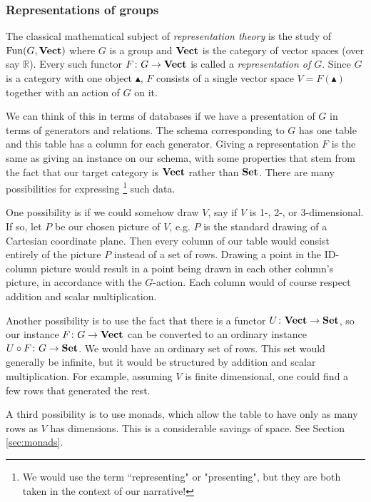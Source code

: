 \documentclass{book}
\def\tn{\textnormal}
\def\RR{{\mathbb R}}
\def\Fun{\tn{Fun}}
\def\to{\rightarrow}
\def\taking{\colon}
\def\monOb{\blacktriangle}
\def\Vect{{\bf Vect}}
\def\Set{{\bf Set}}
\theoremstyle{remark}
\theoremstyle{definition}
\begin{document}

\subsubsection{Representations of groups}\label{ex:reps of groups}

The classical mathematical subject of {\em representation theory} is the study of $\Fun(G,\Vect)$ where $G$ is a group and $\Vect$ is the category of vector spaces (over say $\RR$).\index{a category!$\Vect$} Every such functor $F\taking G\to\Vect$ is called a {\em representation of $G$}. Since $G$ is a category with one object $\monOb$, $F$ consists of a single vector space $V=F(\monOb)$ together with an action of $G$ on it. 

We can think of this in terms of databases if we have a presentation of $G$ in terms of generators and relations. The schema corresponding to $G$ has one table and this table has a column for each generator. Giving a representation $F$ is the same as giving an instance on our schema, with some properties that stem from the fact that our target category is $\Vect$ rather than $\Set$. There are many possibilities for expressing
\footnote{We would use the term ``representing" or "presenting", but they are both taken in the context of our narrative!}
such data.

One possibility is if we could somehow draw $V$, say if $V$ is 1-, 2-, or 3-dimensional. If so, let $P$ be our chosen picture of $V$, e.g. $P$ is the standard drawing of a Cartesian coordinate plane. Then every column of our table would consist entirely of the picture $P$ instead of a set of rows. Drawing a point in the ID-column picture would result in a point being drawn in each other column's picture, in accordance with the $G$-action. Each column would of course respect addition and scalar multiplication.

Another possibility is to use the fact that there is a functor $U\taking\Vect\to\Set$, so our instance $F\taking G\to\Vect$ can be converted to an ordinary instance $U\circ F\taking G\to\Set$. We would have an ordinary set of rows. This set would generally be infinite, but it would be structured by addition and scalar multiplication. For example, assuming $V$ is finite dimensional, one could find a few rows that generated the rest. 

A third possibility is to use monads, which allow the table to have only as many rows as $V$ has dimensions. This is a considerable savings of space. See Section \ref{sec:monads}.
\end{document}

